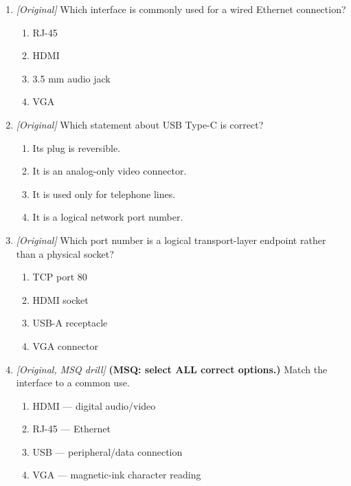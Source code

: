 \begin{enumerate}[label=\textbf{Q\arabic*.}, leftmargin=*]
\item \textit{[Original]} Which interface is commonly used for a wired Ethernet connection?
  \begin{enumerate}[label=\Alph*.]
\item RJ-45
   \item HDMI
   \item 3.5 mm audio jack
   \item VGA
  \end{enumerate}

\item \textit{[Original]} Which statement about USB Type-C is correct?
  \begin{enumerate}[label=\Alph*.]
\item Its plug is reversible.
   \item It is an analog-only video connector.
   \item It is used only for telephone lines.
   \item It is a logical network port number.
  \end{enumerate}

\item \textit{[Original]} Which port number is a logical transport-layer endpoint rather than a physical socket?
  \begin{enumerate}[label=\Alph*.]
\item TCP port 80
   \item HDMI socket
   \item USB-A receptacle
   \item VGA connector
  \end{enumerate}

\item \textit{[Original, MSQ drill]} \textbf{(MSQ: select ALL correct options.)} Match the interface to a common use.
  \begin{enumerate}[label=\Alph*.]
\item HDMI --- digital audio/video
   \item RJ-45 --- Ethernet
   \item USB --- peripheral/data connection
   \item VGA --- magnetic-ink character reading
  \end{enumerate}

\end{enumerate}
